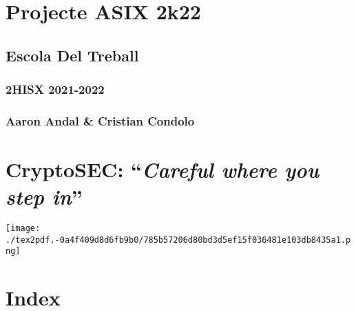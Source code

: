 \documentclass[]{article}
\date{}
\begin{document}
\hypertarget{projecte-asix-2k22}{%
\section{\texorpdfstring{\textbf{Projecte ASIX
2k22}}{Projecte ASIX 2k22}}\label{projecte-asix-2k22}}

\hypertarget{escola-del-treball}{%
\subsection{\texorpdfstring{\textbf{Escola Del
Treball}}{Escola Del Treball}}\label{escola-del-treball}}

\hypertarget{hisx-2021-2022}{%
\subsubsection{\texorpdfstring{\textbf{2HISX
2021-2022}}{2HISX 2021-2022}}\label{hisx-2021-2022}}

\hypertarget{aaron-andal-cristian-condolo}{%
\subsubsection{\texorpdfstring{\textbf{Aaron Andal \& Cristian
Condolo}}{Aaron Andal \& Cristian Condolo}}\label{aaron-andal-cristian-condolo}}

\hypertarget{cryptosec-careful-where-you-step-in}{%
\section{\texorpdfstring{\textbf{CryptoSEC}: ``\emph{Careful where you
step
in}''}{CryptoSEC: ``Careful where you step in''}}\label{cryptosec-careful-where-you-step-in}}

\texttt{[image: ./tex2pdf.-0a4f409d8d6fb9b0/785b57206d80bd3d5ef15f036481e103db8435a1.png]}

\hypertarget{index}{%
\section{\texorpdfstring{\textbf{Index}}{Index}}\label{index}}
\end{document}
